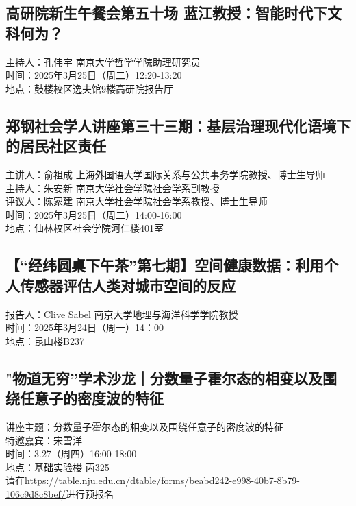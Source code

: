 \documentclass[letterpaper, 12pt]{article}
\begin{document}
\begin{multicols}{2}
\subsection{高研院新生午餐会第五十场 蓝江教授：智能时代下文科何为？}
主持人：孔伟宇 南京大学哲学学院助理研究员\\
时间：2025年3月25日（周二）12:20-13:20\\
地点：鼓楼校区逸夫馆9楼高研院报告厅\\

\subsection{郑钢社会学人讲座第三十三期：基层治理现代化语境下的居民社区责任}
主讲人：俞祖成 上海外国语大学国际关系与公共事务学院教授、博士生导师\\
主持人：朱安新 南京大学社会学院社会学系副教授\\
评议人：陈家建 南京大学社会学院社会学系教授、博士生导师\\
时间：2025年3月25日（周二）14:00-16:00\\
地点：仙林校区社会学院河仁楼401室\\


\subsection{【“经纬圆桌下午茶”第七期】空间健康数据：利用个人传感器评估人类对城市空间的反应}
报告人：Clive Sabel 南京大学地理与海洋科学学院教授\\
时间：2025年3月24日（周一）14：00\\
地点：昆山楼B237\\

\subsection{"物道无穷”学术沙龙｜分数量子霍尔态的相变以及围绕任意子的密度波的特征}
讲座主题：分数量子霍尔态的相变以及围绕任意子的密度波的特征
\\特邀嘉宾：宋雪洋
\\时间：3.27（周四）16:00-18:00
\\地点：基础实验楼 丙325
\\请在\url{https://table.nju.edu.cn/dtable/forms/beabd242-e998-40b7-8b79-106c9d8c8bef/}进行预报名


\end{multicols}
\end{document}
